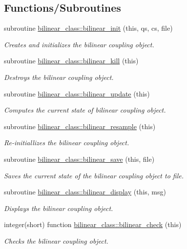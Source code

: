 \subsection*{Functions/\+Subroutines}
\begin{DoxyCompactItemize}
\item 
subroutine \hyperlink{namespacebilinear__class_a767f35cd3ebd5ef00f6a55fd775c3a27}{bilinear\+\_\+class\+::bilinear\+\_\+init} (this, qs, cs, file)
\begin{DoxyCompactList}\small\item\em Creates and initializes the bilinear coupling object. \end{DoxyCompactList}\item 
subroutine \hyperlink{namespacebilinear__class_ae206ab58d224c9a0b7e25ac038e003ae}{bilinear\+\_\+class\+::bilinear\+\_\+kill} (this)
\begin{DoxyCompactList}\small\item\em Destroys the bilinear coupling object. \end{DoxyCompactList}\item 
subroutine \hyperlink{namespacebilinear__class_a37ead815723c4c247c156200f5bf4721}{bilinear\+\_\+class\+::bilinear\+\_\+update} (this)
\begin{DoxyCompactList}\small\item\em Computes the current state of bilinear coupling object. \end{DoxyCompactList}\item 
subroutine \hyperlink{namespacebilinear__class_aac587f5ea6d66ee89ff3210b10569777}{bilinear\+\_\+class\+::bilinear\+\_\+resample} (this)
\begin{DoxyCompactList}\small\item\em Re-\/initiallizes the bilinear coupling object. \end{DoxyCompactList}\item 
subroutine \hyperlink{namespacebilinear__class_a5fe875f5d4db31ef7a7e721ba4a0146a}{bilinear\+\_\+class\+::bilinear\+\_\+save} (this, file)
\begin{DoxyCompactList}\small\item\em Saves the current state of the bilinear coupling object to file. \end{DoxyCompactList}\item 
subroutine \hyperlink{namespacebilinear__class_a4346246df7738e0d609716d961a3b94c}{bilinear\+\_\+class\+::bilinear\+\_\+display} (this, msg)
\begin{DoxyCompactList}\small\item\em Displays the bilinear coupling object. \end{DoxyCompactList}\item 
integer(short) function \hyperlink{namespacebilinear__class_ab2484d90163983597fb17b15e480e675}{bilinear\+\_\+class\+::bilinear\+\_\+check} (this)
\begin{DoxyCompactList}\small\item\em Checks the bilinear coupling object. \end{DoxyCompactList}\end{DoxyCompactItemize}

